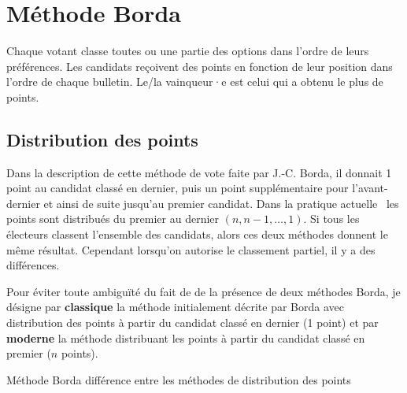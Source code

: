 \documentclass[../report]{subfiles}
\begin{document}
  \section{Méthode Borda}\label{sec:scrutin:borda}
  
  Chaque votant classe toutes ou une partie des options dans l'ordre de leurs préférences.
  Les candidats reçoivent des points en fonction de leur position dans l'ordre de chaque bulletin.
  Le/la vainqueur·e est celui qui a obtenu le plus de points.

  \subsection{Distribution des points}

  Dans la description de cette méthode de vote faite par J.-C. Borda, il donnait 1 point au
  candidat classé en dernier, puis un point supplémentaire pour l'avant-dernier et ainsi
  de suite jusqu'au premier candidat.
  Dans la pratique actuelle~\cite{emerson_original_2013} les points sont distribués du 
  premier au dernier $(n, n-1, …, 1)$.
  Si tous les électeurs classent l'ensemble des candidats, alors ces deux méthodes donnent le même 
  résultat. Cependant lorsqu'on autorise le classement partiel, il y a des différences.

  Pour éviter toute ambiguïté du fait de de la présence de deux méthodes Borda, 
  je désigne par \textbf{classique} la méthode initialement décrite par Borda avec distribution des points à partir du candidat classé en dernier (1 point)
  et par  \textbf{moderne} la méthode distribuant
  les points à partir du candidat classé en premier ($n$ points).

  \begin{table}
    \begin{center}
      \caption{Méthode Borda différence entre les méthodes de distribution des points}%
      \label{fig:diff:borda:caslim2}
    \end{center}
  \end{table}
\end{document}
